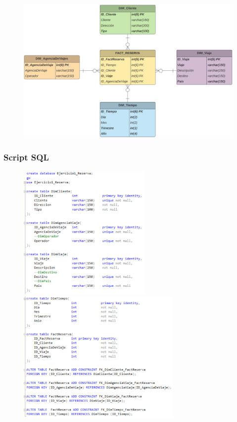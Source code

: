 \documentclass[12pt,letterpaper]{article}
\begin{document}
	\begin{figure}[htb]
		\begin{center}
			\includegraphics[width=14cm]{./Imagenes/mod_dimensional_2}
			
		\end{center}
	\end{figure}

\subsubsection{\textbf{Script SQL }}

	\begin{figure}[htb]
		\begin{center}
			\includegraphics[width=6.5cm]{./Imagenes/Ejercicio2_script1}
			\includegraphics[width=8cm]{./Imagenes/Ejercicio2_script2}
		\end{center}
	\end{figure}
\end{document}
